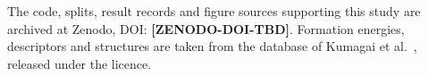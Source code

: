 The code, splits, result records and figure sources supporting this study are archived at Zenodo, DOI: \textbf{[ZENODO-DOI-TBD]}. Formation energies, descriptors and structures are taken from the database of Kumagai et al.\ \citep{Kumagai2021insights}, released under the \ccby{} licence.
